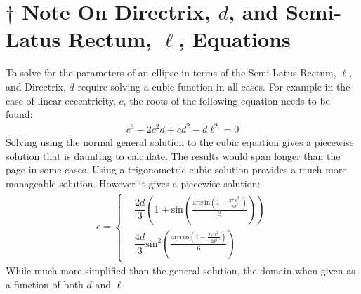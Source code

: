 \documentclass{article}
\begin{document}
\section*{$\dagger$ Note On Directrix, $d$, and Semi-Latus Rectum, $\ell$, Equations}
To solve for the parameters of an ellipse in terms of the Semi-Latus Rectum, $\ell$, and Directrix, $d$ require solving a cubic function in all cases. For example in the case of linear eccentricity, $c$, the roots of the following equation needs to be found:
\begin{align*} %
c^3-2c^2 d+c d^2-d \ell^2 = 0 
\end{align*}
Solving using the normal general solution to the cubic equation gives a piecewise solution that is daunting to calculate. The results would span longer than the page in some cases.
Using a trigonometric cubic solution provides a much more manageable solution. However it gives a piecewise solution:
\begin{align*} 
c =\begin{cases}
 &  \dfrac{2d}{3}  \left (1 + \text{sin} \left (\frac{\text{arcsin}\left (1 - \frac{27 \ell^2}{2 d^2}\right )}{3} \right ) \right )\\ 
 & \dfrac{4d}{3}  \text{sin}^2 \left (\frac{\text{arccos}\left (1 - \frac{27 \ell^2}{2 d^2}\right )}{6} \right )
\end{cases}   
\end{align*}
While much more simplified than the general solution, the domain when given as a function of both $d$ and $\ell$ 
\newpage
\end{document}
